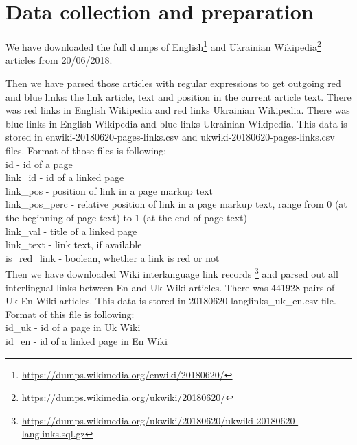 \documentclass[11pt,a4paper]{article}
\begin{document}
\section{Data collection and preparation}

We have downloaded the full dumps of English\footnote{\url{https://dumps.wikimedia.org/enwiki/20180620/}} and Ukrainian Wikipedia\footnote{\url{https://dumps.wikimedia.org/ukwiki/20180620/}} articles from 20/06/2018. 

Then we have parsed those articles with regular expressions to get outgoing red and blue links: the link article, text and position in the current article text. There was red links in English Wikipedia and red links Ukrainian Wikipedia. There was blue links in English Wikipedia and blue links Ukrainian Wikipedia. This data is stored in enwiki-20180620-pages-links.csv and ukwiki-20180620-pages-links.csv files. Format of those files is following:\\
id - id of a page\\
link\_id - id of a linked page\\
link\_pos - position of link in a page markup text\\  
link\_pos\_perc - relative position of link in a page markup text, range from 0 (at the beginning of page text) to 1 (at the end of page text)\\  
link\_val - title of a linked page\\  
link\_text - link text, if available\\  
is\_red\_link - boolean, whether a link is red or not\\  

Then we have downloaded Wiki interlanguage link records \footnote{\url{https://dumps.wikimedia.org/ukwiki/20180620/ukwiki-20180620-langlinks.sql.gz}} and parsed out all interlingual links between En and Uk Wiki articles. There was 441928 pairs of Uk-En Wiki articles. This data is stored in 20180620-langlinks\_uk\_en.csv file. Format of this file is following:\\
id\_uk - id of a page in Uk Wiki\\
id\_en - id of a linked page in En Wiki\\
\end{document}
